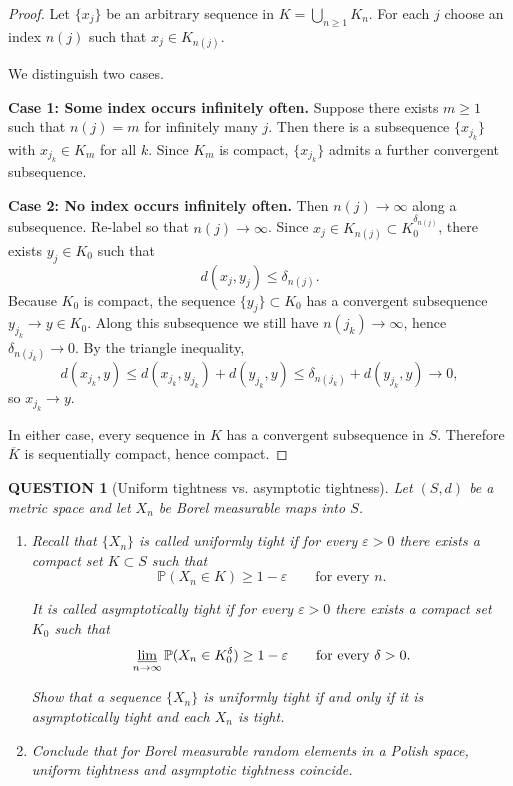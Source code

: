 \documentclass[12pt]{article}
\renewcommand{\(}{\left(}%
\renewcommand{\)}{\right)}%
\renewcommand{\[}{\left[}%
\renewcommand{\]}{\right]}%
\newtheorem{question}{QUESTION}[section]}
\newtheorem{proof}{Proof.}}
\begin{document}
\begin{proof}
Let $\{x_j\}$ be an arbitrary sequence in $K=\bigcup_{n\ge1}K_n$.
For each $j$ choose an index $n(j)$ such that $x_j\in K_{n(j)}$.

We distinguish two cases.

\medskip
\textbf{Case 1: Some index occurs infinitely often.}
Suppose there exists $m\ge1$ such that $n(j)=m$ for infinitely many $j$.
Then there is a subsequence $\{x_{j_k}\}$ with $x_{j_k}\in K_m$ for all $k$.
Since $K_m$ is compact, $\{x_{j_k}\}$ admits a further convergent subsequence.

\medskip
\textbf{Case 2: No index occurs infinitely often.}
Then $n(j)\to\infty$ along a subsequence. Re-label so that $n(j)\to\infty$.
Since $x_j\in K_{n(j)}\subset K_0^{\delta_{n(j)}}$, there exists $y_j\in K_0$ such that
\begin{equation*}
d(x_j,y_j)\le \delta_{n(j)}.
\end{equation*}
Because $K_0$ is compact, the sequence $\{y_j\}\subset K_0$ has a convergent subsequence
$y_{j_k}\to y\in K_0$. Along this subsequence we still have $n(j_k)\to\infty$, hence
$\delta_{n(j_k)}\to0$. By the triangle inequality,
\begin{equation*}
d(x_{j_k},y)\le d(x_{j_k},y_{j_k})+d(y_{j_k},y)
\le \delta_{n(j_k)}+d(y_{j_k},y)\to0,
\end{equation*}
so $x_{j_k}\to y$.

\medskip
In either case, every sequence in $K$ has a convergent subsequence in $S$.
Therefore $\overline{K}$ is sequentially compact, hence compact.
\end{proof}
  
  \begin{question}[Uniform tightness vs. asymptotic tightness]
Let $(S,d)$ be a metric space and let $X_n$ be Borel measurable maps into $S$.

\begin{enumerate}
\item Recall that $\{X_n\}$ is called \emph{uniformly tight} if for every $\varepsilon>0$
there exists a compact set $K\subset S$ such that
\begin{equation*}
\mathbb P(X_n\in K)\ge 1-\varepsilon \qquad \text{for every } n .
\end{equation*}

It is called \emph{asymptotically tight} if for every $\varepsilon>0$ there exists
a compact set $K_0$ such that
\begin{equation*}
\varliminf_{n\to\infty}\mathbb P(X_n\in K_0^\delta)\ge 1-\varepsilon
\qquad \text{for every } \delta>0 .
\end{equation*}

Show that a sequence $\{X_n\}$ is uniformly tight if and only if it is asymptotically
tight and each $X_n$ is tight.

\item Conclude that for Borel measurable random elements in a Polish space,
uniform tightness and asymptotic tightness coincide.
\end{enumerate}
\end{question}
\end{document}
